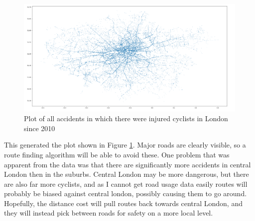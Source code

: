 \documentclass[11pt,twoside,a4paper]{article}
\begin{document}
\begin{figure}[h]
    \begin{center}
    \includegraphics[width=18cm]{chart.png}
    \end{center}
    \caption{Plot of all accidents in which there were injured cyclists in London since 2010}
    \label{chart}
\end{figure}
This generated the plot shown in Figure \ref{chart}. Major roads are clearly visible, so a route finding algorithm will be able to avoid these. One problem that was apparent from the data was that there 
are significantly more accidents in central London then in the suburbs. Central London may be more dangerous, but there are also far more cyclists, and as I cannot get road usage data easily routes will probably be biased against
central london, possibly causing them to go around. Hopefully, the distance cost will pull routes back towards central London, and they will instead pick between roads for safety on a more local level.
\newpage
\end{document}
